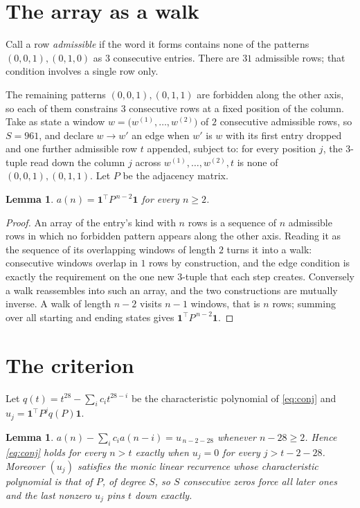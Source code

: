 \documentclass[11pt,a4paper]{article}
\theoremstyle{plain}
\newtheorem{lemma}[theorem]{Lemma}
\theoremstyle{definition}
\begin{document}
\section{The array as a walk}

Call a row \emph{admissible} if the word it forms contains none of the patterns
$(0,0,1), (0,1,0)$ as $3$ consecutive entries. There are $31$ admissible rows; that condition
involves a single row only.

The remaining patterns $(0,0,1), (0,1,1)$ are forbidden along the other axis, so each of them
constrains $3$ consecutive rows at a fixed position of the column. Take as state a
window $w=\bigl(w^{(1)},\dots,w^{(2)}\bigr)$ of $2$ consecutive admissible
rows, so $S=961$, and declare $w\to w'$ an edge when $w'$ is $w$ with its first entry
dropped and one further admissible row $t$ appended, subject to: for every position
$j$, the $3$-tuple read down the column $j$ across $w^{(1)},\dots,w^{(2)},t$
is none of $(0,0,1), (0,1,1)$. Let $P$ be the adjacency matrix.

\begin{lemma}\label{lem:walk}
$a(n)=\mathbf{1}^{\!\top}P^{\,n-2}\mathbf{1}$ for every $n\ge2$.
\end{lemma}

\begin{proof}
An array of the entry's kind with $n$ rows is a sequence of $n$ admissible rows in
which no forbidden pattern appears along the other axis. Reading it as the sequence of its
overlapping windows of length $2$ turns it into a walk: consecutive windows overlap in
$1$ rows by construction, and the edge condition is exactly the requirement on the one
new $3$-tuple that each step creates. Conversely a walk reassembles into such an array,
and the two constructions are mutually inverse. A walk of length $n-2$ visits $n-1$
windows, that is $n$ rows; summing over all starting and ending states gives
$\mathbf{1}^{\!\top}P^{\,n-2}\mathbf{1}$.
\end{proof}

\section{The criterion}

Let $q(t)=t^{28}-\sum_i c_i t^{28-i}$ be the characteristic polynomial of
\eqref{eq:conj} and $u_j=\mathbf{1}^{\!\top}P^{j}q(P)\mathbf{1}$.

\begin{lemma}\label{lem:crit}
$a(n)-\sum_i c_i a(n-i)=u_{\,n-2-28}$ whenever $n-28\ge2$. Hence
\eqref{eq:conj} holds for every $n>t$ exactly when $u_j=0$ for every
$j>t-2-28$. Moreover $(u_j)$ satisfies the monic linear recurrence whose
characteristic polynomial is that of $P$, of degree $S$, so $S$ consecutive zeros force all
later ones and the last nonzero $u_j$ pins $t$ down exactly.
\end{lemma}
\end{document}
